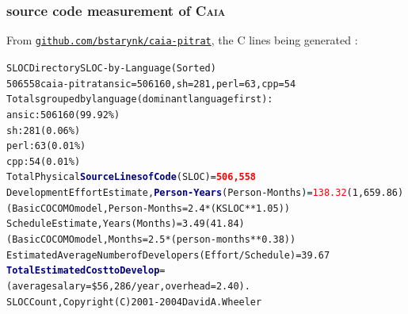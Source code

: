 \documentclass[xcolor=svgnames,final,smaller,a4]{beamer}
\begin{document}
 \begin{frame}
   \frametitle{source code measurement of \textsc{Caia}}

   From \href{https://github.com/bstarynk/caia-pitrat}{\texttt{github.com/bstarynk/caia-pitrat}}, the C lines being generated :

   \begin{relsize}{-1}
   \begin{alltt}
  SLOC	Directory	SLOC-by-Language (Sorted)\\
506558  caia-pitrat     ansic=506160,sh=281,perl=63,cpp=54\\

Totals grouped by language (dominant language first):\\
ansic:       506160 (99.92\%)\\
sh:             281 (0.06\%)\\
perl:            63 (0.01\%)\\
cpp:             54 (0.01\%)\\

Total Physical \textcolor{Navy}{\textbf{Source Lines of Code}} (SLOC)                = \textcolor{red}{\textbf{\large 506,558}}\\
Development Effort Estimate, \textcolor{Navy}{\textbf{Person-Years}} (Person-Months) = \textcolor{red}{138.32} (1,659.86)\\
 (Basic COCOMO model, Person-Months = 2.4 * (KSLOC**1.05))\\
Schedule Estimate, Years (Months)                         = 3.49 (41.84)\\
 (Basic COCOMO model, Months = 2.5 * (person-months**0.38))\\
Estimated Average Number of Developers (Effort/Schedule)  = 39.67\\
\textcolor{Navy}{\textbf{Total Estimated Cost to Develop}}                           = {}\\
 (average salary = \$56,286/year, overhead = 2.40).\\
SLOCCount, Copyright (C) 2001-2004 David A. Wheeler
   \end{alltt}
   \end{relsize}
 \end{frame}
 
\end{document}
